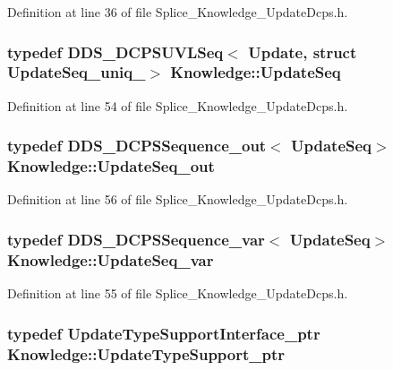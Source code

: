 Definition at line 36 of file Splice\_\-Knowledge\_\-UpdateDcps.h.

\hypertarget{namespaceKnowledge_ab62e46316b954f0d249e0e45de7059dc}{
\subsubsection[{UpdateSeq}]{\setlength{\rightskip}{0pt plus 5cm}typedef DDS\_\-DCPSUVLSeq$<$ {\bf Update}, struct {\bf UpdateSeq\_\-uniq\_\-}$>$ {\bf Knowledge::UpdateSeq}}}
\label{da/d50/namespaceKnowledge_ab62e46316b954f0d249e0e45de7059dc}


Definition at line 54 of file Splice\_\-Knowledge\_\-UpdateDcps.h.

\hypertarget{namespaceKnowledge_a5967b9415eaff0e75480d8e27d0e7d41}{
\subsubsection[{UpdateSeq\_\-out}]{\setlength{\rightskip}{0pt plus 5cm}typedef DDS\_\-DCPSSequence\_\-out$<$ {\bf UpdateSeq}$>$ {\bf Knowledge::UpdateSeq\_\-out}}}
\label{da/d50/namespaceKnowledge_a5967b9415eaff0e75480d8e27d0e7d41}


Definition at line 56 of file Splice\_\-Knowledge\_\-UpdateDcps.h.

\hypertarget{namespaceKnowledge_ac26f4776a7d67bf550ee0060d73af10e}{
\subsubsection[{UpdateSeq\_\-var}]{\setlength{\rightskip}{0pt plus 5cm}typedef DDS\_\-DCPSSequence\_\-var$<$ {\bf UpdateSeq}$>$ {\bf Knowledge::UpdateSeq\_\-var}}}
\label{da/d50/namespaceKnowledge_ac26f4776a7d67bf550ee0060d73af10e}


Definition at line 55 of file Splice\_\-Knowledge\_\-UpdateDcps.h.

\hypertarget{namespaceKnowledge_a35ecd612e6e13cf9fe0df76dfaabf4c5}{
\subsubsection[{UpdateTypeSupport\_\-ptr}]{\setlength{\rightskip}{0pt plus 5cm}typedef {\bf UpdateTypeSupportInterface\_\-ptr} {\bf Knowledge::UpdateTypeSupport\_\-ptr}}}
\label{da/d50/namespaceKnowledge_a35ecd612e6e13cf9fe0df76dfaabf4c5}


